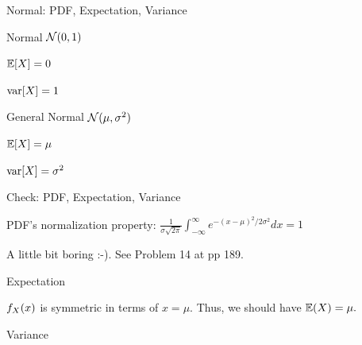 \begin{frame}{Normal: PDF, Expectation, Variance}

{
\plitemsep 0.01in
\bci
\item<1->  Normal $\mathcal N(0,1)$
\item<1-> $\mathbb{E}[ X ] = 0$

\item<1-> $\text{var}[ X ] = 1$
\eci
}
{
\plitemsep 0.01in
\bci
\item<2-> General Normal $\mathcal N(\mu, \sigma^2)$

\item<2-> $\mathbb{E}[ X ] = \mu$

\item<2-> $\text{var}[ X ] = \sigma^2$

\eci
}

\vspace{-1cm}
\vspace{-1cm}
\end{frame}

\begin{frame}{Check: PDF, Expectation, Variance}

\plitemsep 0.07in
\bci
\item PDF's normalization property: $\displaystyle \frac{1}{\sigma\sqrt{2\pi}} \int_{-\infty}^\infty e^{-(x-\mu)^2/2\sigma^2} dx = 1$
\bci
\item<2-> A little bit boring :-). See Problem 14 at pp 189.
\eci

\item<3-> Expectation
\bci
\item $f_X(x)$ is symmetric in terms of $x = \mu.$ Thus, we should have $\mathbb{E}( X ) = \mu.$
\eci

\item<4-> Variance

\eci

\end{frame}

